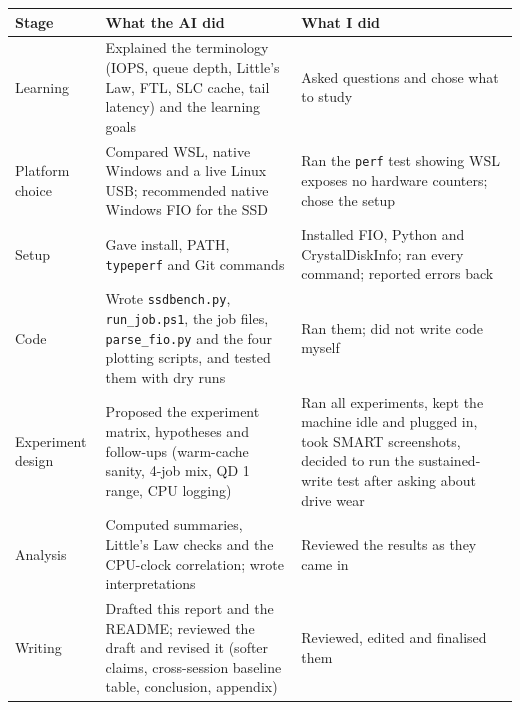 \documentclass[10pt,letterpaper]{article}
\begin{document}
\begin{minipage}{\linewidth}
\begin{minipage}{\linewidth}
\par\smallskip
{\scriptsize
\noindent\begin{tabular}{>{\raggedright\arraybackslash}p{0.2500\dimexpr\linewidth-6\tabcolsep\relax}>{\raggedright\arraybackslash}p{0.3600\dimexpr\linewidth-6\tabcolsep\relax}>{\raggedright\arraybackslash}p{0.3900\dimexpr\linewidth-6\tabcolsep\relax}}
\toprule
\textbf{Stage} & \textbf{What the AI did} & \textbf{What I did} \\ \midrule
Learning & Explained the terminology (IOPS, queue depth, Little's Law, FTL, SLC cache, tail latency) and the learning goals & Asked questions and chose what to study \\
Platform choice & Compared WSL, native Windows and a live Linux USB; recommended native Windows FIO for the SSD & Ran the \texttt{perf} test showing WSL exposes no hardware counters; chose the setup \\
Setup & Gave install, PATH, \texttt{typeperf} and Git commands & Installed FIO, Python and CrystalDiskInfo; ran every command; reported errors back \\
Code & Wrote \texttt{ssdbench.py}, \texttt{run\_job.ps1}, the job files, \texttt{parse\_fio.py} and the four plotting scripts, and tested them with dry runs & Ran them; did not write code myself \\
Experiment design & Proposed the experiment matrix, hypotheses and follow-ups (warm-cache sanity, 4-job mix, QD 1 range, CPU logging) & Ran all experiments, kept the machine idle and plugged in, took SMART screenshots, decided to run the sustained-write test after asking about drive wear \\
Analysis & Computed summaries, Little's Law checks and the CPU-clock correlation; wrote interpretations & Reviewed the results as they came in \\
Writing & Drafted this report and the README; reviewed the draft and revised it (softer claims, cross-session baseline table, conclusion, appendix) & Reviewed, edited and finalised them \\
\bottomrule
\end{tabular}
}
\par\smallskip
\end{minipage}
\end{minipage}\par\medskip
\par\medskip
\end{document}
